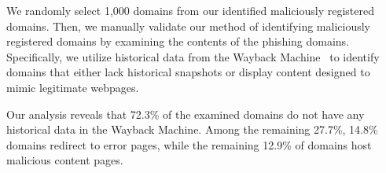 



We randomly select 1,000 domains from our identified maliciously registered domains.
Then, we manually validate our method of identifying maliciously registered domains by examining the contents of the phishing domains.
Specifically, we utilize historical data from the Wayback Machine~\cite{WaybackM89:online} to identify domains that either lack historical snapshots or display content designed to mimic legitimate webpages.

Our analysis reveals that 72.3\% of the examined domains do not have any historical data in the Wayback Machine. Among the remaining 27.7\%, 14.8\% domains redirect to error pages, while the remaining 12.9\% of domains host malicious content pages. 









